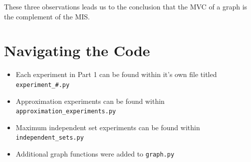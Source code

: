 \documentclass[titlepage]{article}
\begin{document}
These three observations leads us to the conclusion that the MVC of a graph is the complement of the MIS.

\appendix
\section{Navigating the Code}

\begin{itemize}
    \item Each experiment in Part 1 can be found within it's own file titled \verb|experiment_#.py|
    \item Approximation experiments can be found within \verb|approximation_experiments.py|
    \item Maximum independent set experiments can be found within \verb|independent_sets.py|
    \item Additional graph functions were added to \verb|graph.py|
\end{itemize}
\end{document}
